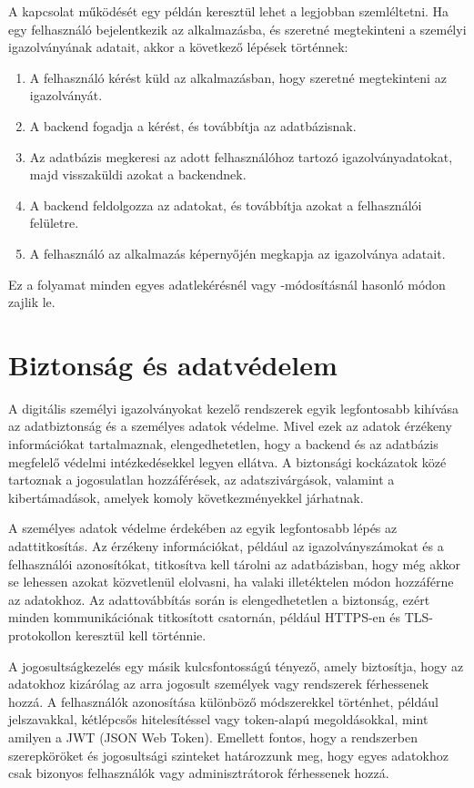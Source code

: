 \documentclass[
]{thesis-ekf}
\theoremstyle{definition}
\theoremstyle{remark}
\begin{document}
	A kapcsolat működését egy példán keresztül lehet a legjobban szemléltetni. Ha egy felhasználó bejelentkezik az alkalmazásba, és szeretné megtekinteni a személyi igazolványának adatait, akkor a következő lépések történnek:
	
	
	\begin{enumerate}
		\item 	A felhasználó kérést küld az alkalmazásban, hogy szeretné megtekinteni az igazolványát.
		\item 	A backend fogadja a kérést, és továbbítja az adatbázisnak.
		\item 	Az adatbázis megkeresi az adott felhasználóhoz tartozó igazolványadatokat, majd visszaküldi azokat a backendnek.
		\item 	A backend feldolgozza az adatokat, és továbbítja azokat a felhasználói felületre.
		\item 	A felhasználó az alkalmazás képernyőjén megkapja az igazolványa adatait.
	\end{enumerate}
	Ez a folyamat minden egyes adatlekérésnél vagy -módosításnál hasonló módon zajlik le.
	
	\section{Biztonság és adatvédelem}
	A digitális személyi igazolványokat kezelő rendszerek egyik legfontosabb kihívása az adatbiztonság és a személyes adatok védelme. Mivel ezek az adatok érzékeny információkat tartalmaznak, elengedhetetlen, hogy a backend és az adatbázis megfelelő védelmi intézkedésekkel legyen ellátva. A biztonsági kockázatok közé tartoznak a jogosulatlan hozzáférések, az adatszivárgások, valamint a kibertámadások, amelyek komoly következményekkel járhatnak.
	
	A személyes adatok védelme érdekében az egyik legfontosabb lépés az adattitkosítás. Az érzékeny információkat, például az igazolványszámokat és a felhasználói azonosítókat, titkosítva kell tárolni az adatbázisban, hogy még akkor se lehessen azokat közvetlenül elolvasni, ha valaki illetéktelen módon hozzáférne az adatokhoz. Az adattovábbítás során is elengedhetetlen a biztonság, ezért minden kommunikációnak titkosított csatornán, például HTTPS-en és TLS-protokollon keresztül kell történnie.
	
	A jogosultságkezelés egy másik kulcsfontosságú tényező, amely biztosítja, hogy az adatokhoz kizárólag az arra jogosult személyek vagy rendszerek férhessenek hozzá. A felhasználók azonosítása különböző módszerekkel történhet, például jelszavakkal, kétlépcsős hitelesítéssel vagy token-alapú megoldásokkal, mint amilyen a JWT (JSON Web Token). Emellett fontos, hogy a rendszerben szerepköröket és jogosultsági szinteket határozzunk meg, hogy egyes adatokhoz csak bizonyos felhasználók vagy adminisztrátorok férhessenek hozzá.
	
\end{document}
